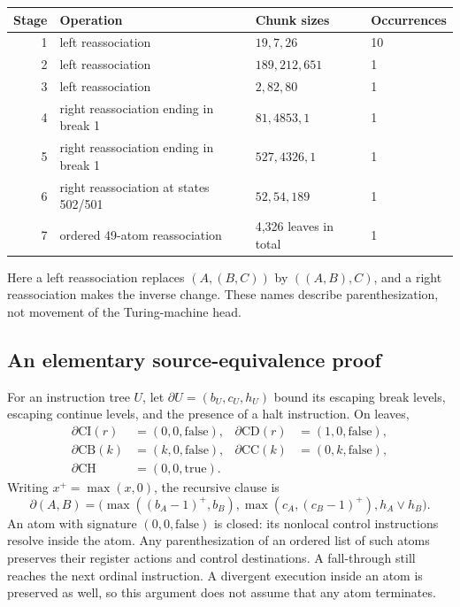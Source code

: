 \begin{center}
\begin{tabular}{rlll}
Stage & Operation & Chunk sizes & Occurrences\\\hline
1 & left reassociation & $19,7,26$ & 10\\
2 & left reassociation & $189,212,651$ & 1\\
3 & left reassociation & $2,82,80$ & 1\\
4 & right reassociation ending in break 1 & $81,4853,1$ & 1\\
5 & right reassociation ending in break 1 & $527,4326,1$ & 1\\
6 & right reassociation at states 502/501 & $52,54,189$ & 1\\
7 & ordered 49-atom reassociation & 4,326 leaves in total & 1
\end{tabular}
\end{center}

Here a left reassociation replaces $(A,(B,C))$ by $((A,B),C)$, and a
right reassociation makes the inverse change.  These names describe
parenthesization, not movement of the Turing-machine head.

\subsection{An elementary source-equivalence proof}

For an instruction tree $U$, let
$\partial U=(b_U,c_U,h_U)$ bound its escaping break levels, escaping
continue levels, and the presence of a halt instruction.  On leaves,
\[
\begin{aligned}
 \partial\mathrm{CI}(r)&=(0,0,\mathrm{false}),&
 \partial\mathrm{CD}(r)&=(1,0,\mathrm{false}),\\
 \partial\mathrm{CB}(k)&=(k,0,\mathrm{false}),&
 \partial\mathrm{CC}(k)&=(0,k,\mathrm{false}),\\
 \partial\mathrm{CH}&=(0,0,\mathrm{true}).
\end{aligned}
\]
Writing $x^+=\max(x,0)$, the recursive clause is
\[
 \partial(A,B)=
 \bigl(\max((b_A-1)^+,b_B),
       \max(c_A,(c_B-1)^+),h_A\lor h_B\bigr).
\]
An atom with signature $(0,0,\mathrm{false})$ is closed: its nonlocal
control instructions resolve inside the atom.  Any parenthesization of
an ordered list of such atoms preserves their register actions and
control destinations.  A fall-through still reaches the next ordinal
instruction.  A divergent execution inside an atom is preserved as
well, so this argument does not assume that any atom terminates.


